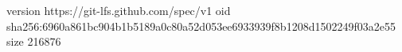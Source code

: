 version https://git-lfs.github.com/spec/v1
oid sha256:6960a861bc904b1b5189a0c80a52d053ee6933939f8b1208d1502249f03a2e55
size 216876
